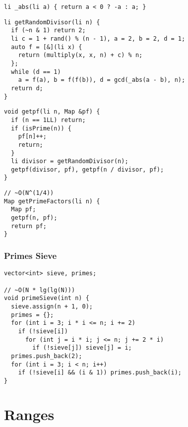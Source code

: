 \documentclass[twoside]{article}
\begin{document}
\begin{multicols*}{2}
\begin{verbatim}
li _abs(li a) { return a < 0 ? -a : a; }
\end{verbatim}
\vspace{-12pt}
\begin{verbatim}
li getRandomDivisor(li n) {
  if (~n & 1) return 2;
  li c = 1 + rand() % (n - 1), a = 2, b = 2, d = 1;
  auto f = [&](li x) {
    return (multiply(x, x, n) + c) % n;
  };
  while (d == 1)
    a = f(a), b = f(f(b)), d = gcd(_abs(a - b), n);
  return d;
}
\end{verbatim}
\vspace{-12pt}
\begin{verbatim}
void getpf(li n, Map &pf) {
  if (n == 1LL) return;
  if (isPrime(n)) {
    pf[n]++;
    return;
  }
  li divisor = getRandomDivisor(n);
  getpf(divisor, pf), getpf(n / divisor, pf);
}
\end{verbatim}
\vspace{-12pt}
\begin{verbatim}
// ~O(N^(1/4))
Map getPrimeFactors(li n) {
  Map pf;
  getpf(n, pf);
  return pf;
}
\end{verbatim}

\subsubsectionfont{\large\bfseries\sffamily\underline}
\subsubsection*{Primes Sieve}
\begin{verbatim}
vector<int> sieve, primes;

// ~O(N * lg(lg(N)))
void primeSieve(int n) {
  sieve.assign(n + 1, 0);
  primes = {};
  for (int i = 3; i * i <= n; i += 2)
    if (!sieve[i])
      for (int j = i * i; j <= n; j += 2 * i)
        if (!sieve[j]) sieve[j] = i;
  primes.push_back(2);
  for (int i = 3; i < n; i++)
    if (!sieve[i] && (i & 1)) primes.push_back(i);
}
\end{verbatim}

\sectionfont{\bfseries\sffamily\centering\Huge}
\vspace{1em}
\section*{Ranges}
\vspace{3em}
\subsectionfont{\bfseries\sffamily\centering\LARGE}
\vspace{0em}

\end{multicols*}
\end{document}
